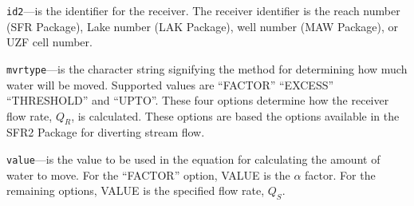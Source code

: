 \begin{description}
\item \texttt{id2}---is the identifier for the receiver.  The receiver identifier is the reach number (SFR Package), Lake number (LAK Package), well number (MAW Package), or UZF cell number.

\item \texttt{mvrtype}---is the character string signifying the method for determining how much water will be moved.  Supported values are ``FACTOR'' ``EXCESS'' ``THRESHOLD'' and ``UPTO''.  These four options determine how the receiver flow rate, $Q_R$, is calculated.  These options are based the options available in the SFR2 Package for diverting stream flow.

\item \texttt{value}---is the value to be used in the equation for calculating the amount of water to move.  For the ``FACTOR'' option, VALUE is the $\alpha$ factor.  For the remaining options, VALUE is the specified flow rate, $Q_S$.

\end{description}

